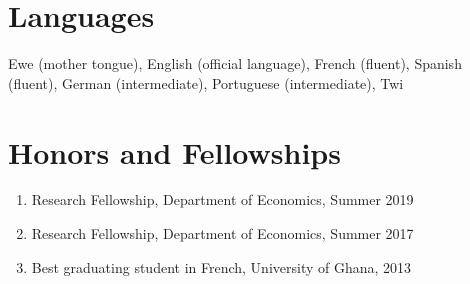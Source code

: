 \documentclass[letterpaper]{article}
\begin{document}
\section*{Languages}
Ewe (mother tongue), English (official language), French (fluent), Spanish (fluent), German (intermediate),  Portuguese (intermediate), Twi

\section*{Honors and Fellowships}
\begin{enumerate}
  \item Research Fellowship, Department of Economics, Summer 2019
  \item Research Fellowship, Department of Economics, Summer 2017
  \item Best graduating student in French, University of Ghana, 2013
\end{enumerate}
\end{document}
